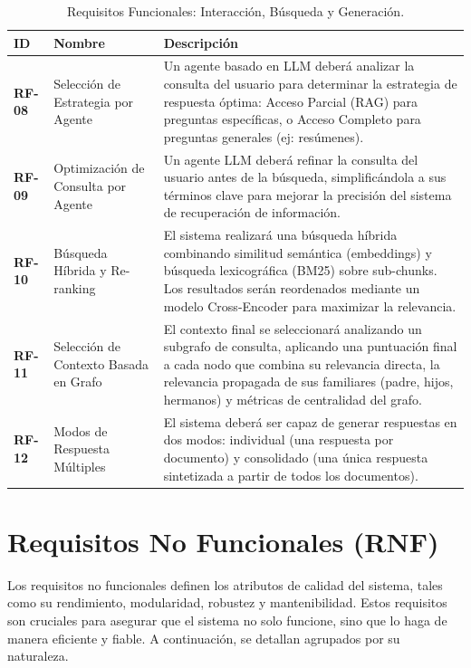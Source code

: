 \begin{table}[H]
\centering
\renewcommand{\arraystretch}{1.4}
\caption{Requisitos Funcionales: Interacción, Búsqueda y Generación.}
\label{tab:rf_interaccion}
\begin{tabularx}{\textwidth}{|l|l|X|}
\hline
\textbf{ID} & \textbf{Nombre} & \textbf{Descripción} \\
\hline
\textbf{RF-08} & Selección de Estrategia por Agente & Un agente basado en LLM deberá analizar la consulta del usuario para determinar la estrategia de respuesta óptima: Acceso Parcial (RAG) para preguntas específicas, o Acceso Completo para preguntas generales (ej: resúmenes). \\
\hline
\textbf{RF-09} & Optimización de Consulta por Agente & Un agente LLM deberá refinar la consulta del usuario antes de la búsqueda, simplificándola a sus términos clave para mejorar la precisión del sistema de recuperación de información. \\
\hline
\textbf{RF-10} & Búsqueda Híbrida y Re-ranking & El sistema realizará una búsqueda híbrida combinando similitud semántica (embeddings) y búsqueda lexicográfica (BM25) sobre sub-chunks. Los resultados serán reordenados mediante un modelo Cross-Encoder para maximizar la relevancia. \\
\hline
\textbf{RF-11} & Selección de Contexto Basada en Grafo & El contexto final se seleccionará analizando un subgrafo de consulta, aplicando una puntuación final a cada nodo que combina su relevancia directa, la relevancia propagada de sus familiares (padre, hijos, hermanos) y métricas de centralidad del grafo. \\
\hline
\textbf{RF-12} & Modos de Respuesta Múltiples & El sistema deberá ser capaz de generar respuestas en dos modos: individual (una respuesta por documento) y consolidado (una única respuesta sintetizada a partir de todos los documentos). \\
\hline
\end{tabularx}
\end{table}
\newpage

\section{Requisitos No Funcionales (RNF)}
\label{sec:rnf}

Los requisitos no funcionales definen los atributos de calidad del sistema, tales como su rendimiento, modularidad, robustez y mantenibilidad. Estos requisitos son cruciales para asegurar que el sistema no solo funcione, sino que lo haga de manera eficiente y fiable. A continuación, se detallan agrupados por su naturaleza.

